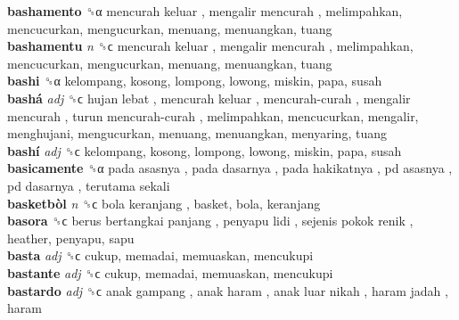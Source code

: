 \textbf{bashamento} ␝α   mencurah keluar ,  mengalir mencurah , melimpahkan, mencucurkan, mengucurkan, menuang, menuangkan, tuang  \\
\textbf{bashamentu} \emph{n}  ␝ϲ   mencurah keluar ,  mengalir mencurah , melimpahkan, mencucurkan, mengucurkan, menuang, menuangkan, tuang  \\
\textbf{bashi} ␝α  kelompang, kosong, lompong, lowong, miskin, papa, susah  \\
\textbf{bashá} \emph{adj}  ␝ϲ   hujan lebat ,  mencurah keluar ,  mencurah-curah ,  mengalir mencurah ,  turun mencurah-curah , melimpahkan, mencucurkan, mengalir, menghujani, mengucurkan, menuang, menuangkan, menyaring, tuang  \\
\textbf{bashí} \emph{adj}  ␝ϲ  kelompang, kosong, lompong, lowong, miskin, papa, susah  \\
\textbf{basicamente} ␝α   pada asasnya ,  pada dasarnya ,  pada hakikatnya ,  pd asasnya ,  pd dasarnya ,  terutama sekali   \\
\textbf{basketbòl} \emph{n}  ␝ϲ   bola keranjang , basket, bola, keranjang  \\
\textbf{basora} ␝ϲ   berus bertangkai panjang ,  penyapu lidi ,  sejenis pokok renik , heather, penyapu, sapu  \\
\textbf{basta} \emph{adj}  ␝ϲ  cukup, memadai, memuaskan, mencukupi  \\
\textbf{bastante} \emph{adj}  ␝ϲ  cukup, memadai, memuaskan, mencukupi  \\
\textbf{bastardo} \emph{adj}  ␝ϲ   anak gampang ,  anak haram ,  anak luar nikah ,  haram jadah , haram  \\
